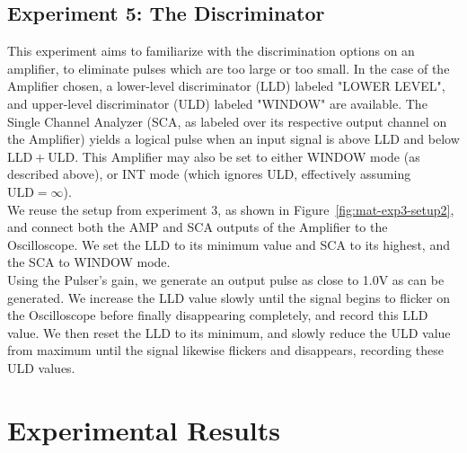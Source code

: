 \documentclass[12pt]{article}
\begin{document}
\subsection{Experiment 5: The Discriminator}
This experiment aims to familiarize with the discrimination options on an amplifier, to eliminate pulses which are too large or too small.
In the case of the Amplifier chosen, a lower-level discriminator (LLD) labeled "LOWER LEVEL", and upper-level discriminator (ULD) labeled "WINDOW" are available.
The Single Channel Analyzer (SCA, as labeled over its respective output channel on the Amplifier) yields a logical pulse when an input signal is above LLD and below $\mathrm{LLD+ULD}$.
This Amplifier may also be set to either WINDOW mode (as described above), or INT mode (which ignores ULD, effectively assuming $\mathrm{ULD=\infty}$).\\
We reuse the setup from experiment 3, as shown in Figure~\ref{fig:mat-exp3-setup2}, and connect both the AMP and SCA outputs of the Amplifier to the Oscilloscope.
We set the LLD to its minimum value and SCA to its highest, and the SCA to WINDOW mode.\\
Using the Pulser's gain, we generate an output pulse as close to 1.0V as can be generated. We increase the LLD value slowly until the signal begins to flicker on the Oscilloscope before finally disappearing completely, and record this LLD value. We then reset the LLD to its minimum, and slowly reduce the ULD value from maximum until the signal likewise flickers and disappears, recording these ULD values.
\section{Experimental Results}\label{sec:results}
\end{document}
